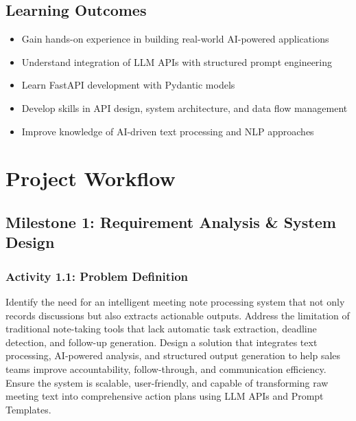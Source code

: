 \documentclass[12pt,a4paper]{article}
\begin{document}
\subsection{Learning Outcomes}
\begin{itemize}
  \item Gain hands-on experience in building real-world AI-powered applications
  \item Understand integration of LLM APIs with structured prompt engineering
  \item Learn FastAPI development with Pydantic models
  \item Develop skills in API design, system architecture, and data flow management
  \item Improve knowledge of AI-driven text processing and NLP approaches
\end{itemize}


\section{Project Workflow}

\subsection{Milestone 1: Requirement Analysis \& System Design}

\subsubsection{Activity 1.1: Problem Definition}
Identify the need for an intelligent meeting note processing system that not only records discussions but also extracts actionable outputs. Address the limitation of traditional note-taking tools that lack automatic task extraction, deadline detection, and follow-up generation. Design a solution that integrates text processing, AI-powered analysis, and structured output generation to help sales teams improve accountability, follow-through, and communication efficiency. Ensure the system is scalable, user-friendly, and capable of transforming raw meeting text into comprehensive action plans using LLM APIs and Prompt Templates.
\end{document}
